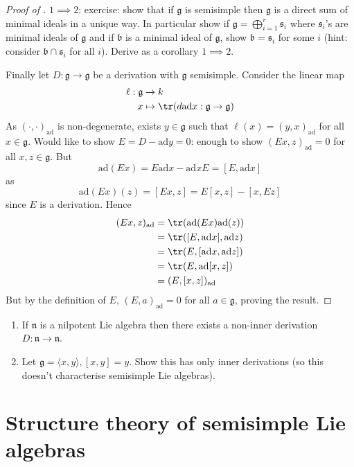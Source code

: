 \documentclass[a4paper]{article}
\newcommand*{\Lie}[1]{\mathfrak{#1}} %
\newcommand{\ad}{\mathrm{ad}} %
\begin{document}
\begin{proof}[Proof of ]
  \(1 \implies 2\): exercise: show that if \(\Lie g\) is semisimple then \(\Lie g\) is a direct sum of minimal ideals in a unique way. In particular show if \(\Lie g = \bigoplus_{i = 1}^r \Lie s_i\) where \(\Lie s_i\)'s are minimal ideals of \(\Lie g\) and if \(\Lie b\) is a minimal ideal of \(\Lie g\), show \(\Lie b = \Lie s_i\) for some \(i\) (hint: consider \(\Lie b \cap \Lie s_i\) for all \(i\)). Derive as a corollary \(1 \implies 2\).

  Finally let \(D: \Lie g \to \Lie g\) be a derivation with \(\Lie g\) semisimple. Consider the linear map
  \begin{align*}
    \ell: \Lie g &\to k \\
    x &\mapsto \tr (d \ad x: \Lie g \to \Lie g)
  \end{align*}
  As \((\cdot, \cdot)_\ad\) is non-degenerate, exists \(y \in \Lie g\) such that \(\ell(x) = (y, x)_\ad\) for all \(x \in \Lie g\). Would like to show \(E = D - \ad y = 0\): enough to show \((Ex, z)_\ad = 0\) for all \(x, z \in \Lie g\). But
  \[
    \ad(Ex) = E \ad x - \ad x E = [E, \ad x]
  \]
  as
  \[
    \ad(Ex)(z) = [Ex, z] = E[x, z] - [x, Ez]
  \]
  since \(E\) is a derivation. Hence
  \begin{align*}
    (Ex, z)_\ad
    &= \tr(\ad(Ex) \ad(z)) \\
    &= \tr([E, \ad x], \ad z) \\
    &= \tr(E, [\ad x, \ad z]) \\
    &= \tr(E, \ad[x, z]) \\
    &= (E, [x, z])_\ad
  \end{align*}
  But by the definition of \(E\), \((E, a)_\ad = 0\) for all \(a \in \Lie g\), proving the result.
\end{proof}

\begin{ex}\leavevmode
  \begin{enumerate}
  \item If \(\Lie n\) is a nilpotent Lie algebra then there exists a non-inner derivation \(D: \Lie n \to \Lie n\).
  \item Let \(\Lie g = \langle x, y\rangle, [x, y] = y\). Show this has only inner derivations (so this doesn't characterise semisimple Lie algebras).
  \end{enumerate}
\end{ex}

\section{Structure theory of semisimple Lie algebras}
\end{document}
